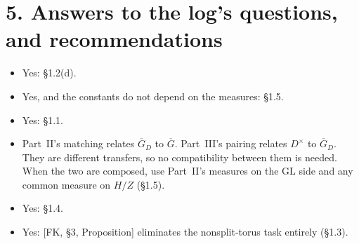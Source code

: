 \documentclass[11pt]{article}
\newcommand{\GL}{\mathrm{GL}}
\newcommand{\Gb}{\overline G}
\newcommand{\GDb}{\overline G_D}
\theoremstyle{definition}
\begin{document}
\section*{5. Answers to the log's questions, and recommendations}
\begin{itemize}
\item[(Q1)] Yes: \S1.2(d).
\item[(Q2)] Yes, and the constants do not depend on the measures: \S1.5.
\item[(Q3)] Yes: \S1.1.
\item[(Q4)] Part~II's matching relates $\GDb$ to $\Gb$. Part~III's
pairing relates $D^\times$ to $\GDb$. They are different transfers, so no
compatibility between them is needed. When the two are composed, use
Part~II's measures on the $\GL$ side and any common measure on $H/Z$
(\S1.5).
\item[(Q5)] Yes: \S1.4.
\item[(Q6)] Yes: [FK, \S3, Proposition] eliminates the nonsplit-torus
task entirely (\S1.3).
\end{itemize}
\end{document}
